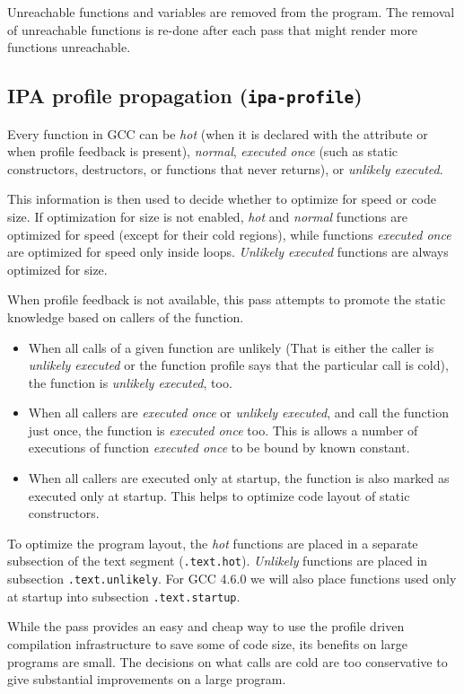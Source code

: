 \documentclass[final]{ols}
\begin{document}
Unreachable functions and variables are removed from the program.  The removal of
unreachable functions is re-done after each pass that might render more
functions unreachable.
\subsection{IPA profile propagation ({\tt ipa-profile})}
Every function in GCC can be {\em hot} (when it is declared with the
 attribute or when profile feedback is present), {\em normal}, {\em
executed once} (such as static constructors, destructors,  or
functions that never returns), or {\em unlikely executed}.

This information is then used to decide whether to optimize for speed or code
size. If optimization for size is not enabled, {\em hot} and {\em normal} functions are
optimized for speed (except for their cold regions), while functions {\em executed once} are optimized for speed only
inside loops. {\em Unlikely executed} functions are always optimized for size.

When profile feedback is not available, this pass attempts to promote the static
knowledge based on callers of the function.
\begin{itemize}
\item When all calls of a given function are unlikely (That is either the caller is {\em unlikely executed} or the function profile says that the
particular call is cold), the function is {\em unlikely executed}, too.
\item When all callers are {\em executed once} or {\em unlikely executed}, and call the function just once, the function is {\em executed once}
too. This is allows a number of executions of function {\em executed once} to be bound by known constant.
\item When all callers are executed only at startup, the function is also marked as executed only at startup.
This helps to optimize code layout of static constructors.
\end{itemize}

To optimize the program layout, the {\em hot} functions are placed in a separate
subsection of the text segment ({\tt .text.hot}). {\em Unlikely} functions are
placed in subsection {\tt .text.unlikely}. For GCC 4.6.0 we will also place
functions used only at startup into subsection {\tt .text.startup}.

While the pass provides an easy and cheap way to use the profile driven compilation
infrastructure to save some of code size, its benefits on large programs are
small. The decisions on what calls are cold are too conservative to give substantial
improvements on a large program.
\end{document}
